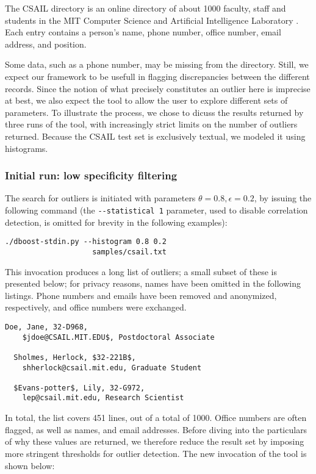 The CSAIL directory is an online directory of about 1000 faculty, staff and students in the MIT Computer Science and Artificial Intelligence Laboratory \cite{CSAILDirectory}. Each entry contains a person's name, phone number, office number, email address, and position.

Some data, such as a phone number, may be missing from the directory. Still, we expect our framework to be usefull in flagging discrepancies between the different records. Since the notion of what precisely constitutes an outlier here is imprecise at best, we also expect the tool to allow the user to explore different sets of parameters. To illustrate the process, we chose to dicuss the results returned by three runs of the tool, with increasingly strict limits on the number of outliers returned. Because the CSAIL test set is exclusively textual, we modeled it using histograms.

\subsubsection{Initial run: low specificity filtering}
The search for outliers is initiated with parameters $\theta = 0.8, \epsilon = 0.2$, by issuing the following command (the \lstinline{--statistical 1} parameter, used to disable correlation detection, is omitted for brevity in the following examples):

\begin{lstlisting}[gobble=2]
  ./dboost-stdin.py --histogram 0.8 0.2 
                    samples/csail.txt
\end{lstlisting}

This invocation produces a long list of outliers; a small subset of these is presented below; for privacy reasons, names have been omitted in the following listings. Phone numbers and emails have been removed and anonymized, respectively, and office numbers were exchanged.

\begin{lstlisting}[gobble=2]
  Doe, Jane, 32-D968, 
    $jdoe@CSAIL.MIT.EDU$, Postdoctoral Associate

  Sholmes, Herlock, $32-221B$, 
    shherlock@csail.mit.edu, Graduate Student

  $Evans-potter$, Lily, 32-G972, 
    lep@csail.mit.edu, Research Scientist
\end{lstlisting}

In total, the list covers 451 lines, out of a total of 1000. Office numbers are often flagged, as well as names, and email addresses. Before diving into the particulars of why these values are returned, we therefore reduce the result set by imposing more stringent thresholds for outlier detection. The new invocation of the tool is shown below: 

